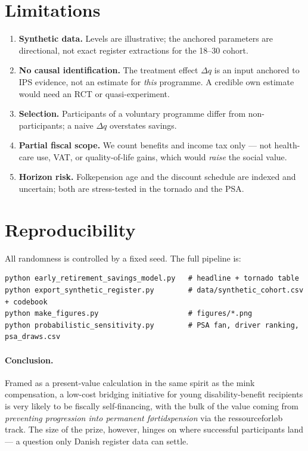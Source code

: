 \documentclass[11pt,a4paper]{article}
\begin{document}
\section{Limitations}
\begin{enumerate}[nosep]
  \item \textbf{Synthetic data.} Levels are illustrative; the anchored
    parameters are directional, not exact register extractions for the 18--30
    cohort.
  \item \textbf{No causal identification.} The treatment effect $\Delta q$ is an
    input anchored to IPS evidence, not an estimate for \emph{this} programme.
    A credible own estimate would need an RCT or quasi-experiment.
  \item \textbf{Selection.} Participants of a voluntary programme differ from
    non-participants; a naive $\Delta q$ overstates savings.
  \item \textbf{Partial fiscal scope.} We count benefits and income tax only ---
    not health-care use, VAT, or quality-of-life gains, which would
    \emph{raise} the social value.
  \item \textbf{Horizon risk.} Folkepension age and the discount schedule are
    indexed and uncertain; both are stress-tested in the tornado and the PSA.
\end{enumerate}

\section{Reproducibility}
All randomness is controlled by a fixed seed. The full pipeline is:
\begin{verbatim}
python early_retirement_savings_model.py   # headline + tornado table
python export_synthetic_register.py        # data/synthetic_cohort.csv + codebook
python make_figures.py                     # figures/*.png
python probabilistic_sensitivity.py        # PSA fan, driver ranking, psa_draws.csv
\end{verbatim}

\paragraph{Conclusion.}
Framed as a present-value calculation in the same spirit as the mink
compensation, a low-cost bridging initiative for young disability-benefit
recipients is very likely to be fiscally self-financing, with the bulk of the
value coming from \emph{preventing progression into permanent f\o rtidspension}
via the ressourceforl\o b track. The size of the prize, however, hinges on
where successful participants land --- a question only Danish register data can
settle.
\end{document}

